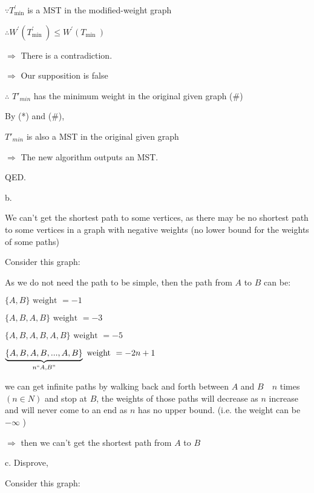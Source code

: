 \documentclass[12pt]{article}
\begin{document}
$\because T_{\min }^{\prime}$ is a MST in the modified-weight graph

$\therefore W^{\prime}\left(T_{\text {min }}^{\prime}\right) \leqslant W^{\prime}\left(T_{\text {min }}\right)$

$\Rightarrow$ There is a contradiction.

$\Rightarrow$ Our supposition is false

$\therefore $ $T'_{min}$ has the minimum weight in the original given graph
(\#)

By (*) and (\#),

$T'_{min}$ is also a MST in the original given graph

$\Rightarrow$ The new algorithm outputs an MST.

QED.

b.

We can't get the shortest path to some vertices, as there may be no shortest path to some vertices in a graph with negative weights (no lower bound for the weights of some paths) 

Consider this graph: 
\begin{center}
\end{center}

As we do not need the path to be simple, then the path from $A$ to $B$ can be:

$\{A, B\} \text { weight }=-1 $

$ \{A,  B, A, B\} \text { weight }=-3 $

$ \{A, B, A, B, A, B\} \text {  weight }=-5$

$ \underbrace{\{A,  B,  A,  B,..., A,  B\}}_{n ``A, B"} \text { weight }=-2 n+1$

we can get infinite paths by walking back and forth between $A$ and $B\quad  n$ times $(n \in N)$ and stop at $B$, the weights of those paths will decrease as $n$ increase and will never come to an end as $n$ has no upper bound. (i.e. the weight can be $-\infty$ )

$\Rightarrow$ then we can't get the shortest path from $A$ to $B$

c. Disprove,

Consider this graph:
\begin{center}
\end{center}
\end{document}
